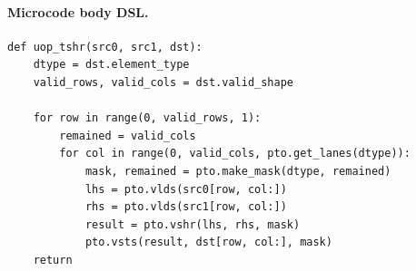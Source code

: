 \paragraph{Microcode body DSL.}
\begin{lstlisting}[style=ptocode]
def uop_tshr(src0, src1, dst):
    dtype = dst.element_type
    valid_rows, valid_cols = dst.valid_shape

    for row in range(0, valid_rows, 1):
        remained = valid_cols
        for col in range(0, valid_cols, pto.get_lanes(dtype)):
            mask, remained = pto.make_mask(dtype, remained)
            lhs = pto.vlds(src0[row, col:])
            rhs = pto.vlds(src1[row, col:])
            result = pto.vshr(lhs, rhs, mask)
            pto.vsts(result, dst[row, col:], mask)
    return
\end{lstlisting}
\Needspace{0.34\textheight}
